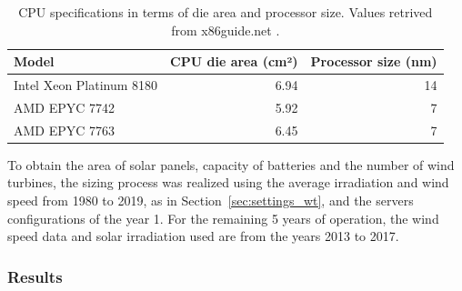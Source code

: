 \begin{table}[h]
  \small
  \caption{CPU specifications in terms of die area and processor size. Values retrived from x86guide.net \cite{ref_amd_epyc_7742,ref_amd_epyc_7763,ref_xeon_platinum_8180}.} \centering
  \label{tab:cpu_specs} 
  \begin{tabular}{|l|r|r|}
   \hline

  \textbf{Model}  & \textbf{CPU die area (cm²)} & \textbf{Processor size (nm) } \\
    \hline
    Intel Xeon Platinum 8180 & 6.94 & 14\\
    \hline
    AMD EPYC 7742  & 5.92 & 7 \\
   \hline
    AMD EPYC 7763 & 6.45   & 7 \\
  \hline
\end{tabular}  
\end{table}

To obtain the area of solar panels, capacity of batteries and the number of wind turbines, the sizing process was realized using the average irradiation and wind speed from 1980 to 2019, as in Section~\ref{sec:settings_wt}, and the servers configurations of the year 1. For the remaining 5 years of operation, the wind speed data and solar irradiation used are from the years 2013 to 2017.

\subsubsection{Results}

